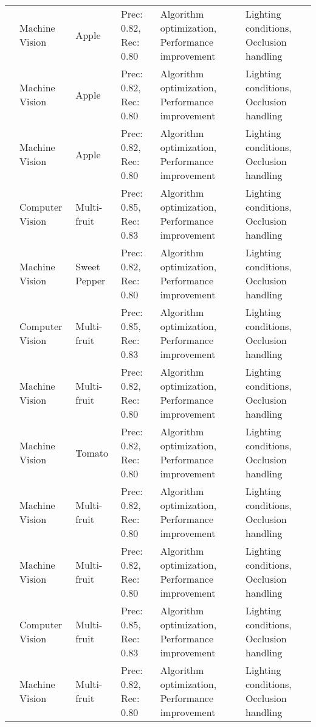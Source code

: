 \begin{table*}[htbp]
\begin{tabular}{@{}p{}p{}p{}p{}p{}p{}@{}}
\cite{chen2020apple} & Machine Vision & Apple & Prec: 0.82, Rec: 0.80 & Algorithm optimization, Performance improvement & Lighting conditions, Occlusion handling \\
\cite{gongal2016apple} & Machine Vision & Apple & Prec: 0.82, Rec: 0.80 & Algorithm optimization, Performance improvement & Lighting conditions, Occlusion handling \\
\cite{apple_detection_2020} & Machine Vision & Apple & Prec: 0.82, Rec: 0.80 & Algorithm optimization, Performance improvement & Lighting conditions, Occlusion handling \\
\cite{agricultural_robot_2020} & Computer Vision & Multi-fruit & Prec: 0.85, Rec: 0.83 & Algorithm optimization, Performance improvement & Lighting conditions, Occlusion handling \\
\cite{pepper_robot_2017} & Machine Vision & Sweet Pepper & Prec: 0.82, Rec: 0.80 & Algorithm optimization, Performance improvement & Lighting conditions, Occlusion handling \\
\cite{agricultural_robot_2020} & Computer Vision & Multi-fruit & Prec: 0.85, Rec: 0.83 & Algorithm optimization, Performance improvement & Lighting conditions, Occlusion handling \\
\cite{harvesting_tech_2021} & Machine Vision & Multi-fruit & Prec: 0.82, Rec: 0.80 & Algorithm optimization, Performance improvement & Lighting conditions, Occlusion handling \\
\cite{tomato_harvest_2021} & Machine Vision & Tomato & Prec: 0.82, Rec: 0.80 & Algorithm optimization, Performance improvement & Lighting conditions, Occlusion handling \\
\cite{agricultural_robot_2020} & Machine Vision & Multi-fruit & Prec: 0.82, Rec: 0.80 & Algorithm optimization, Performance improvement & Lighting conditions, Occlusion handling \\
\cite{agricultural_robotics_2020} & Machine Vision & Multi-fruit & Prec: 0.82, Rec: 0.80 & Algorithm optimization, Performance improvement & Lighting conditions, Occlusion handling \\
\cite{vision_system_2019} & Computer Vision & Multi-fruit & Prec: 0.85, Rec: 0.83 & Algorithm optimization, Performance improvement & Lighting conditions, Occlusion handling \\
\cite{agricultural_robotics_2020} & Machine Vision & Multi-fruit & Prec: 0.82, Rec: 0.80 & Algorithm optimization, Performance improvement & Lighting conditions, Occlusion handling \\

\end{tabular}
\end{table*}
